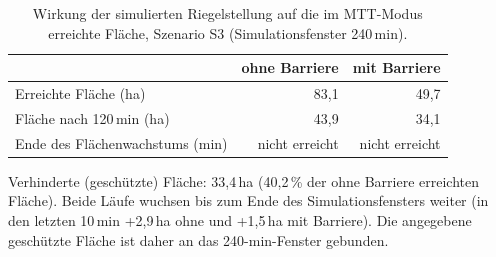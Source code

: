 \begin{table}[htbp]
  \centering
  \caption{Wirkung der simulierten Riegelstellung auf die im MTT-Modus erreichte Fläche, Szenario S3 (Simulationsfenster 240\,min).}
  \label{tab:mtt-barriere}
  \begin{tabular}{lrr}
    \toprule
     & ohne Barriere & mit Barriere \\
    \midrule
    Erreichte Fläche (ha)            & 83{,}1            & 49{,}7 \\
    Fläche nach 120\,min (ha)        & 43{,}9            & 34{,}1 \\
    Ende des Flächenwachstums (min)  & nicht erreicht    & nicht erreicht \\
    \bottomrule
  \end{tabular}
  \par\smallskip\footnotesize Verhinderte (geschützte) Fläche: 33{,}4\,ha (40{,}2\,\% der ohne Barriere erreichten Fläche). Beide Läufe wuchsen bis zum Ende des Simulationsfensters weiter (in den letzten 10\,min +2{,}9\,ha ohne und +1{,}5\,ha mit Barriere). Die angegebene geschützte Fläche ist daher an das 240-min-Fenster gebunden.
\end{table}
